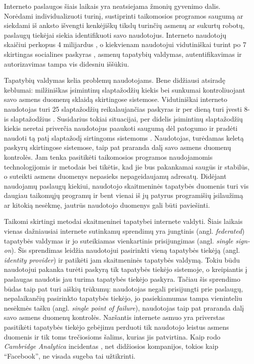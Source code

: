 Interneto paslaugos šiais laikais yra neatsiejama žmonių gyvenimo dalis.
Norėdami individualizuoti turinį, sustiprinti taikomosios programos saugumą ar siekdami
iš anksto išvengti kenkėjiškų tikslų turinčių asmenų ar sukurtų robotų, paslaugų tiekėjai
siekia identifikuoti savo naudotojus. Interneto naudotojų skaičiui perkopus 4 milijardus \cite{InternetUsers2018},
o kiekvienam naudotojui vidutiniškai turint po 7 skirtingas socialines paskyras \cite{Mander2017}, asmenų
tapatybių valdymas, autentifikavimas ir autorizavimas tampa vis didesniu iššūkiu.

Tapatybių valdymas kelia problemų naudotojams. Bene didžiausi atsiradę keblumai:
milžiniškas įsimintinų slaptažodžių kiekis bei sunkumai kontroliuojant savo asmens duomenų sklaidą
skirtingose sistemose. Vidutiniškai interneto naudotojas turi 25 slaptažodžių reikalaujančias paskyras
ir per dieną turi įvesti 8-is slaptažodžius \cite{Florencio2007}. Susidarius tokiai situacijai, per didelis įsimintinų slaptažodžių kiekis neretai 
priverčia naudotojus paaukoti saugumą dėl patogumo
ir pradėti naudoti tą patį slaptažodį sirtingoms sistemoms \cite{Pashalidis2003, Samar1999}. Naudotojas, turėdamas keletą
paskyrų skirtingose sistemose, taip pat praranda dalį savo asmens duomenų kontrolės. Jam tenka pasitikėti
taikomosios programos naudojamomis technologijomis ir metodais bei tikėtis, kad jie bus pakankamai saugūs
ir stabilūs, o suteikti asmens duomenys nepasieks nepageidaujamų adresatų. Didėjant naudojamų paslaugų kiekiui,
naudotojo skaitmeninės tapatybės duomenis turi vis daugiau taikomųjų programų ir bent vienai iš jų
patyrus programišių įsilaužimą ar kitokią nesėkmę, jautrūs naudotojo duomenys gali būti paviešinti. 

Taikomi skirtingi metodai skaitmeninei tapatybei internete valdyti. 
Šiais laikais vienas dažniausiai internete sutinkamų sprendimų yra jungtinis (angl. \textit{federated}) tapatybės valdymas ir jo suteikiamas vienkartinis prisijungimas (angl. \textit{single sign-on}).
Šis sprendimas leidžia naudotojui pasirinkti
vieną tapatybės tiekėją (angl. \textit{identity provider}) ir patikėti jam skaitmeninės tapatybės valdymą. Tokiu
būdu naudotojui pakanka turėti paskyrą tik tapatybės tiekėjo sistemoje, o kreipiantis į paslaugas naudotis jau turima tapatybės tiekėjo paskyra.
Tačiau šis sprendimo būdas taip pat turi aiškių trūkumų: naudotojas negali prisijungti
prie paslaugų, nepalaikančių pasirinkto tapatybės tiekėjo, jo pasiekiamumas
tampa vieninteliu nesėkmės tašku (angl. \textit{single point of failure}), naudotojas taip pat praranda dalį savo asmens duomenų kontrolės.
Naršantis internete asmuo yra priverstas pasitikėti tapatybės tiekėjo
gebėjimu perduoti tik naudotojo leistus asmens duomenis ir tik toms trečiosioms šalims, kurias jis patvirtina.
Kaip rodo \textit{Cambridge Analytica} incidentas \cite{CambridgeAnalytica}, net didžiosios kompanijos, tokios
kaip \enquote{Facebook}, ne visada sugeba tai užtikrinti.


